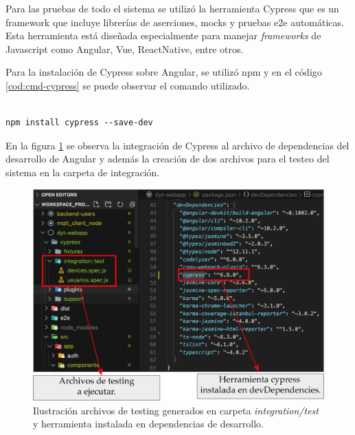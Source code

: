 Para las pruebas de todo el sistema se utilizó la herramienta Cypress \citep{WEBSITE:46} que es un framework que incluye librerías de aserciones, mocks y pruebas e2e \citep{WEBSITE:48} automáticas. Esta herramienta está diseñada especialmente para manejar \textit{frameworks} de Javascript como Angular, Vue, ReactNative, entre otros.

Para la instalación de Cypress sobre Angular, se utilizó npm \citep{WEBSITE:47} y en el código \ref{cod:cmd-cypress} se puede observar el comando utilizado. 

\begin{lstlisting}[label=cod:cmd-cypress,caption=Comando de instalación de Cypress en Angular.] 

npm install cypress --save-dev
\end{lstlisting}

En la figura \ref{fig:cypress-install} se observa la integración de Cypress al archivo de dependencias del desarrollo de Angular  y además la creación de dos archivos para el testeo del sistema en la carpeta de integración. 

\begin{figure}[htpb]
	\centering
	\includegraphics[scale=.9]{./Figures/cypress-install.png}
	\caption[Archivos de instalación de Cypress]{Ilustración archivos de testing generados en carpeta \textit{integration/test} y herramienta instalada en dependencias de desarrollo.}
	\label{fig:cypress-install}
\end{figure}



